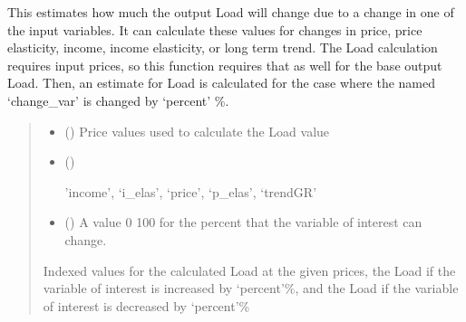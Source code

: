 \documentclass[letterpaper,10pt,english]{sphinxmanual}
\begin{document}
\begin{fulllineitems}
\begin{fulllineitems}
\label{\detokenize{src.models.residential.scripts.residential:src.models.residential.scripts.residential.residentialModule.complex_step_sensitivity}}
\pysigstartsignatures
\pysiglinewithargsret
{}
{\sphinxparamcomma {}\sphinxparamcomma {}}
{}
\pysigstopsignatures
\sphinxAtStartPar
This estimates how much the output Load will change due to a change in one of the input
variables. It can calculate these values for changes in price, price elasticity, income,
income elasticity, or long term trend. The Load calculation requires input prices, so this
function requires that as well for the base output Load. Then, an estimate for Load is
calculated for the case where the named ‘change\_var’ is changed by ‘percent’ \%.
\begin{quote}\begin{description}
\begin{itemize}
\item {} 
\sphinxAtStartPar
{} () \textendash{} Price values used to calculate the Load value

\item {} 
\sphinxAtStartPar
{} () \textendash{} \begin{description}
\sphinxAtStartPar
’income’, ‘i\_elas’, ‘price’, ‘p\_elas’, ‘trendGR’

\end{description}


\item {} 
\sphinxAtStartPar
{} () \textendash{} A value 0 \sphinxhyphen{} 100 for the percent that the variable of interest can change.

\end{itemize}

\sphinxAtStartPar
Indexed values for the calculated Load at the given prices, the Load if the variable
of interest is increased by ‘percent’\%, and the Load if the variable of interest is
decreased by ‘percent’\%


\end{description}
\end{quote}
\end{fulllineitems}
\end{fulllineitems}
\end{document}
